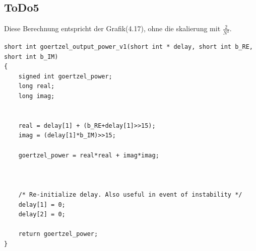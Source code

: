 \documentclass[a4paper,11pt]{article}
\begin{document}
\subsection{ToDo5}
Diese Berechnung entspricht der Grafik(4.17), ohne die skalierung mit $\frac{2}{N^2}$.
\begin{lstlisting}
short int goertzel_output_power_v1(short int * delay, short int b_RE, short int b_IM)
{
	signed int goertzel_power;
	long real;
	long imag;


	real = delay[1] + (b_RE+delay[1]>>15);
	imag = (delay[1]*b_IM)>>15;

	goertzel_power = real*real + imag*imag;



    /* Re-initialize delay. Also useful in event of instability */
	delay[1] = 0;
	delay[2] = 0;

	return goertzel_power;
}
\end{lstlisting}
\end{document}
